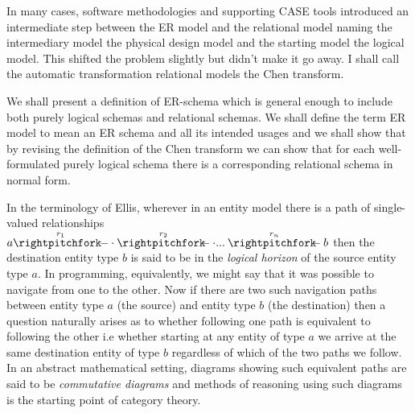 \documentclass[10pt,a4paper]{article}
\begin{document}
In many cases, software methodologies and supporting CASE tools introduced an intermediate step between the ER model and the relational model naming the intermediary model the physical design model and the starting model the logical
model. This shifted the problem slightly but didn't make it go away. I shall call the automatic transformation relational models the Chen transform.  

We shall present a  definition of ER-schema which is general enough to include both purely logical schemas  and relational  schemas. We shall define the term ER model to mean an ER schema and all its intended usages and we shall show that by revising the definition of the Chen transform we can show that for each well-formulated purely logical schema there is a corresponding relational schema in normal form. 

In the terminology of Ellis\cite{ellis1982}, wherever in an entity model there is a path of single-valued relationships 
$\overset{r_1}{a \rightpitchfork \hspace{-0.35em} -  \cdot} \overset{r_2}{\rightpitchfork \hspace{-0.35em} -} \cdot ... \overset{r_n}{\rightpitchfork \hspace{-0.35em} -} b$
then the destination entity type $b$ is said to be in the \textit{logical horizon}  of the source entity type $a$. In programming, equivalently, 
we might say that it was possible to navigate from one to the other. Now if there are two such navigation paths between entity type $a$ (the source) and entity type $b$ (the destination) then a question naturally arises as to whether following one path is equivalent to
following the other i.e whether starting at any entity of type $a$ we arrive at the same destination entity of type $b$ regardless of which of the two paths we follow. In an abstract mathematical setting, diagrams showing such equivalent
paths are said to be \textit{commutative diagrams} and methods of reasoning using such diagrams is the starting point of category theory. 
\end{document}
